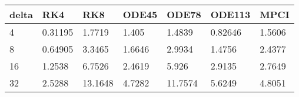 \begin{tabular}{lllllll}
delta & RK4 & RK8 & ODE45 & ODE78 & ODE113 & MPCI \\ 
\hline 
4 & 0.31195 & 1.7719 & 1.405 & 1.4839 & 0.82646 & 1.5606 \\ 
8 & 0.64905 & 3.3465 & 1.6646 & 2.9934 & 1.4756 & 2.4377 \\ 
16 & 1.2538 & 6.7526 & 2.4619 & 5.926 & 2.9135 & 2.7649 \\ 
32 & 2.5288 & 13.1648 & 4.7282 & 11.7574 & 5.6249 & 4.8051 \\ 
\hline 
\end{tabular}